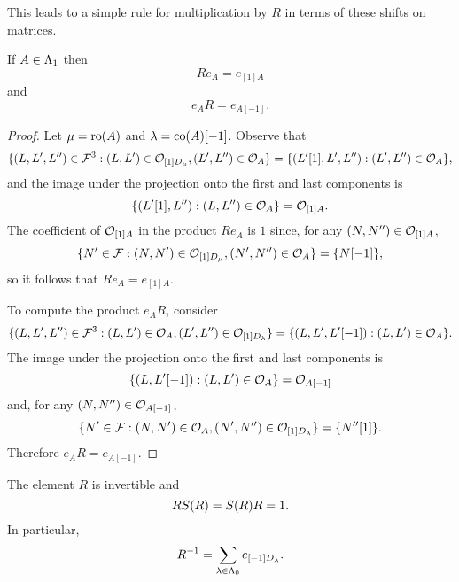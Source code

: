 \documentclass[a4paper, 11pt]{report}
\begin{document}
This leads to a simple rule for multiplication by $R$ in terms of these shifts on matrices.

\begin{lemma}\label{lemma:action-of-R}
If $A\in\Lambda_1{}$ then
\begin{equation*}
R e_A = e_{[1]A}
\end{equation*}
and
\begin{equation*}
e_A R = e_{A[-1]}.
\end{equation*}
\end{lemma}

\begin{proof}
Let $\mu = \operatorname{ro}(A)$ and $\lambda=\operatorname{co}(A)[-1]$. Observe that
\begin{equation*}
\{(L,L',L'')\in\mathcal{F}^3: (L,L')\in\mathcal{O}_{[1]D_\mu}, (L',L'')\in\mathcal{O}_{A}\} = \{(L'[1],L',L''): (L',L'')\in\mathcal{O}_{A}\},
\end{equation*}
and the image under the projection onto the first and last components is
\begin{equation*}
\{(L'[1],L''):(L,L'')\in\mathcal{O}_{A}\} = \mathcal{O}_{[1]A}.
\end{equation*}
The coefficient of $\mathcal{O}_{[1]A}$ in the product $Re_A$ is $1$ since, for any $(N,N'')\in\mathcal{O}_{[1]A}$,
\begin{equation*}
\{N'\in\mathcal{F}: (N,N')\in\mathcal{O}_{[1]D_\mu}, (N',N'')\in\mathcal{O}_{A}\} = \{N[-1]\},
\end{equation*}
so it follows that $Re_A = e_{[1]A}$.

To compute the product $e_A R$, consider
\begin{equation*}
\{(L,L',L'')\in\mathcal{F}^3: (L,L')\in\mathcal{O}_{A}, (L',L'')\in\mathcal{O}_{[1]D_\lambda}\} = \{(L,L',L'[-1]):(L,L')\in\mathcal{O}_{A}\}.
\end{equation*}
The image under the projection onto the first and last components is
\begin{equation*}
\{(L,L'[-1]):(L,L')\in\mathcal{O}_{A}\} = \mathcal{O}_{A[-1]}
\end{equation*}
and, for any $(N,N'')\in\mathcal{O}_{A[-1]}$,
\begin{equation*}
\{N'\in\mathcal{F}:(N,N')\in\mathcal{O}_{A}, (N',N'')\in\mathcal{O}_{[1]D_\lambda}\} = \{N''[1]\}.
\end{equation*}
Therefore $e_A R = e_{A[-1]}$.
\end{proof}

\begin{lemma}\label{lemma:R-is-a-unit}
The element $R$ is invertible and
\begin{equation*}
R S{(R)} = S{(R)} R = 1.
\end{equation*}
In particular,
\begin{equation*}
R^{-1} = \sum_{\lambda\in\Lambda_0{}} e_{[-1]D_\lambda}.
\end{equation*}
\end{lemma}
\end{document}
